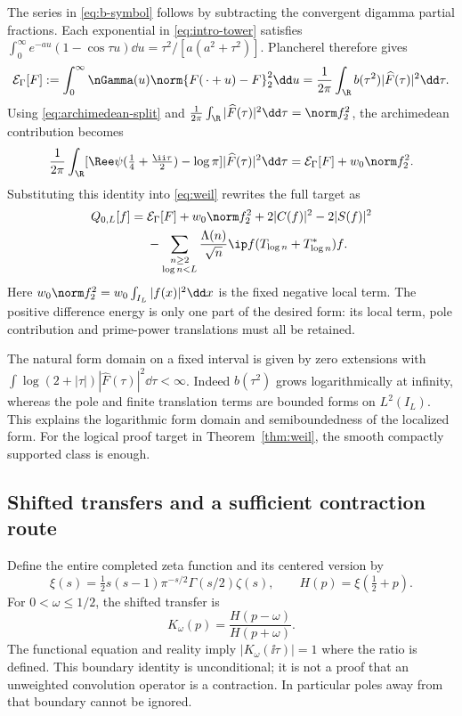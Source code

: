 The series in \eqref{eq:b-symbol} follows by subtracting the convergent digamma partial
fractions. Each exponential in \eqref{eq:intro-tower} satisfies
$\int_0^\infty e^{-a u}(1-\cos\tau u)\dd u
=\tau^2/[a(a^2+\tau^2)]$. Plancherel therefore gives
\begin{equation}\label{eq:kinetic}
 \mathcal E_\Gamma[F]
 :=\int_0^\infty\nGamma(u)\norm{F(\,\cdot+u)-F}_2^2\dd u
 =\frac1{2\pi}\int_\R b(\tau^2)|\widehat F(\tau)|^2\dd\tau.
\end{equation}
Using \eqref{eq:archimedean-split} and
$\frac1{2\pi}\int_\R|\widehat F(\tau)|^2\dd\tau=\norm f_2^2$,
the archimedean contribution becomes
\begin{equation}\label{eq:archimedean-energy}
 \frac1{2\pi}\int_\R
 [\Ree\psi(\tfrac14+\tfrac{\ii\tau}2)-\log\pi]
 |\widehat F(\tau)|^2\dd\tau
 =\mathcal E_\Gamma[F]+w_0\norm f_2^2.
\end{equation}
Substituting this identity into \eqref{eq:weil} rewrites the full target as
\begin{align}\label{eq:weil-energy}
 Q_{0,L}[f]={}&\mathcal E_\Gamma[F]+w_0\norm f_2^2
 +2|C(f)|^2-2|S(f)|^2\notag\\
 &-\sum_{\substack{n\geq2\\\log n<L}}
 \frac{\Lambda(n)}{\sqrt n}\ip f{(T_{\log n}+T_{\log n}^*)f}.
\end{align}
Here $w_0\norm f_2^2=w_0\int_{I_L}|f(x)|^2\dd x$ is the fixed
negative local term. The positive difference energy is only one part of
the desired form: its local term, pole contribution and prime-power
translations must all be retained.

The natural form domain on a fixed interval is given by zero extensions
with $\int\log(2+|\tau|)|\widehat F(\tau)|^2\dd\tau<\infty$.
Indeed $b(\tau^2)$ grows logarithmically at infinity, whereas the pole
and finite translation terms are bounded forms on $L^2(I_L)$. This
explains the logarithmic form domain and semiboundedness of the
localized form. For the logical proof target in Theorem~\ref{thm:weil},
the smooth compactly supported class is enough.

\subsection{Shifted transfers and a sufficient contraction route}

Define the entire completed zeta function and its centered version by
\begin{equation}
 \xi(s)=\tfrac12s(s-1)\pi^{-s/2}\Gamma(s/2)\zeta(s),
 \qquad H(p)=\xi(\tfrac12+p).
\end{equation}
For $0<\omega\leq1/2$, the shifted transfer is
\begin{equation}\label{eq:transfer}
 K_\omega(p)=\frac{H(p-\omega)}{H(p+\omega)}.
\end{equation}
The functional equation and reality imply $|K_\omega(\ii\tau)|=1$
where the ratio is defined. This boundary identity is unconditional;
it is not a proof that an unweighted convolution operator is a
contraction. In particular poles away from that boundary cannot be
ignored.

